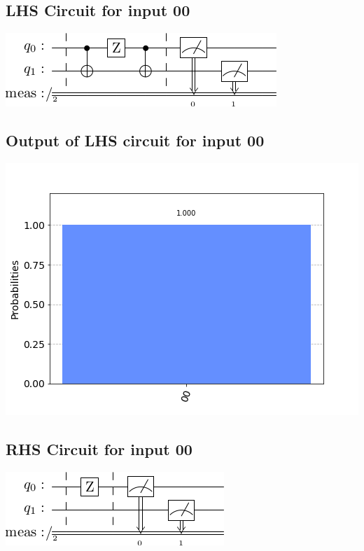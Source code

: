 \documentclass[a4paper]{article}
\begin{document}
    \begin{answer}[Question 1 b (b)]
        \subsection*{LHS Circuit for input 00}
        \includegraphics[scale=0.5]{b100.png}
        \subsection*{Output of LHS circuit for input 00}
        \includegraphics[scale = 0.5]{b100-out.png}
        \subsection*{RHS Circuit for input 00}
        \includegraphics[scale=0.5]{b200.png}

\end{answer}
\end{document}
